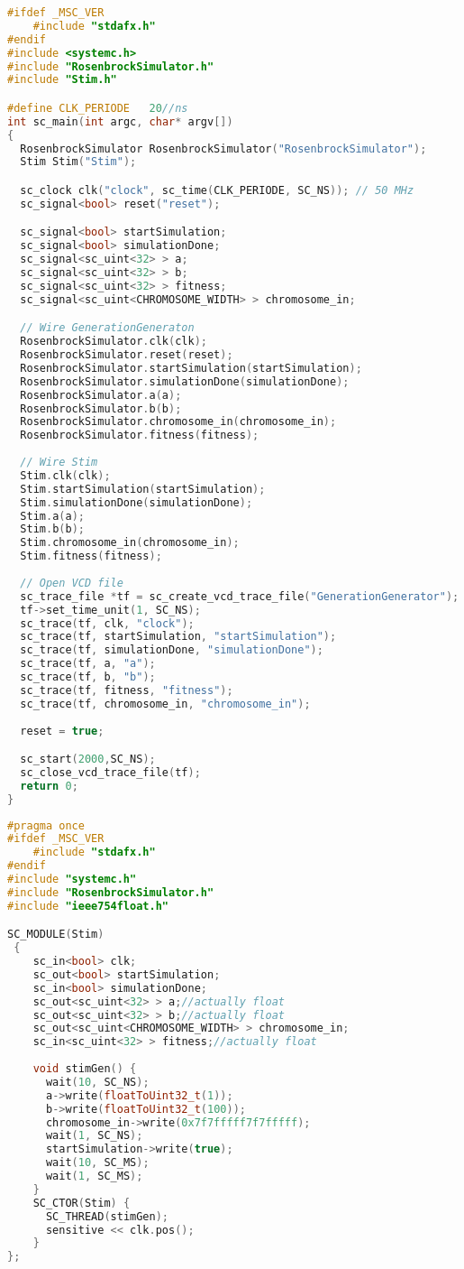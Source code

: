 \begin{lstlisting}[language=C++,caption={Testbench for RosenbrockSimulator},label={lst:rosenbrock_testbench}]
#ifdef _MSC_VER
	#include "stdafx.h"
#endif
#include <systemc.h>
#include "RosenbrockSimulator.h"
#include "Stim.h"

#define CLK_PERIODE   20//ns
int sc_main(int argc, char* argv[])
{
  RosenbrockSimulator RosenbrockSimulator("RosenbrockSimulator");
  Stim Stim("Stim");

  sc_clock clk("clock", sc_time(CLK_PERIODE, SC_NS)); // 50 MHz
  sc_signal<bool> reset("reset");

  sc_signal<bool> startSimulation;
  sc_signal<bool> simulationDone;
  sc_signal<sc_uint<32> > a;
  sc_signal<sc_uint<32> > b;
  sc_signal<sc_uint<32> > fitness;
  sc_signal<sc_uint<CHROMOSOME_WIDTH> > chromosome_in;

  // Wire GenerationGeneraton
  RosenbrockSimulator.clk(clk);
  RosenbrockSimulator.reset(reset);
  RosenbrockSimulator.startSimulation(startSimulation);
  RosenbrockSimulator.simulationDone(simulationDone);
  RosenbrockSimulator.a(a);
  RosenbrockSimulator.b(b);
  RosenbrockSimulator.chromosome_in(chromosome_in);
  RosenbrockSimulator.fitness(fitness);
  
  // Wire Stim
  Stim.clk(clk);
  Stim.startSimulation(startSimulation);
  Stim.simulationDone(simulationDone);
  Stim.a(a);
  Stim.b(b);
  Stim.chromosome_in(chromosome_in);
  Stim.fitness(fitness);
 
  // Open VCD file
  sc_trace_file *tf = sc_create_vcd_trace_file("GenerationGenerator");
  tf->set_time_unit(1, SC_NS);
  sc_trace(tf, clk, "clock");
  sc_trace(tf, startSimulation, "startSimulation");
  sc_trace(tf, simulationDone, "simulationDone");
  sc_trace(tf, a, "a");
  sc_trace(tf, b, "b");
  sc_trace(tf, fitness, "fitness");
  sc_trace(tf, chromosome_in, "chromosome_in");
  
  reset = true;

  sc_start(2000,SC_NS);
  sc_close_vcd_trace_file(tf);
  return 0;
}
\end{lstlisting}

\begin{lstlisting}[language=C++,caption={Testbench for RosenbrockSimulator},label={lst:rosenbrock_testbench}]
#pragma once
#ifdef _MSC_VER
	#include "stdafx.h"
#endif
#include "systemc.h"
#include "RosenbrockSimulator.h"
#include "ieee754float.h"

SC_MODULE(Stim)
 {
    sc_in<bool> clk;
    sc_out<bool> startSimulation;
    sc_in<bool> simulationDone;
    sc_out<sc_uint<32> > a;//actually float
    sc_out<sc_uint<32> > b;//actually float
    sc_out<sc_uint<CHROMOSOME_WIDTH> > chromosome_in;
    sc_in<sc_uint<32> > fitness;//actually float
	
    void stimGen() {
      wait(10, SC_NS);
      a->write(floatToUint32_t(1));
      b->write(floatToUint32_t(100));
      chromosome_in->write(0x7f7fffff7f7fffff);
      wait(1, SC_NS);
      startSimulation->write(true);
      wait(10, SC_MS);
      wait(1, SC_MS);
    }
    SC_CTOR(Stim) {
      SC_THREAD(stimGen);
      sensitive << clk.pos();
    }
};
\end{lstlisting}



